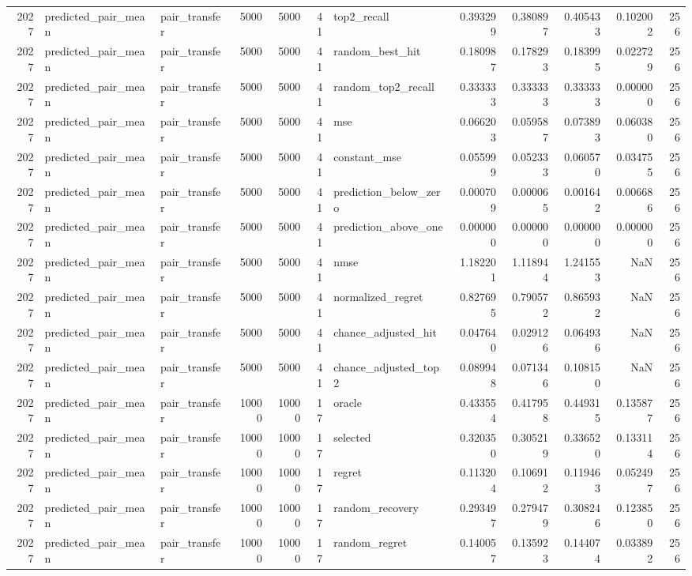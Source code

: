 \begin{tabular}{rllrrrlrrrrr}
2027 & predicted_pair_mean & pair_transfer & 5000 & 5000 & 41 & top2_recall & 0.393299 & 0.380897 & 0.405433 & 0.102002 & 256 \\
2027 & predicted_pair_mean & pair_transfer & 5000 & 5000 & 41 & random_best_hit & 0.180987 & 0.178293 & 0.183995 & 0.022729 & 256 \\
2027 & predicted_pair_mean & pair_transfer & 5000 & 5000 & 41 & random_top2_recall & 0.333333 & 0.333333 & 0.333333 & 0.000000 & 256 \\
2027 & predicted_pair_mean & pair_transfer & 5000 & 5000 & 41 & mse & 0.066203 & 0.059587 & 0.073893 & 0.060380 & 256 \\
2027 & predicted_pair_mean & pair_transfer & 5000 & 5000 & 41 & constant_mse & 0.055999 & 0.052333 & 0.060570 & 0.034755 & 256 \\
2027 & predicted_pair_mean & pair_transfer & 5000 & 5000 & 41 & prediction_below_zero & 0.000709 & 0.000065 & 0.001642 & 0.006686 & 256 \\
2027 & predicted_pair_mean & pair_transfer & 5000 & 5000 & 41 & prediction_above_one & 0.000000 & 0.000000 & 0.000000 & 0.000000 & 256 \\
2027 & predicted_pair_mean & pair_transfer & 5000 & 5000 & 41 & nmse & 1.182201 & 1.118944 & 1.241553 & NaN & 256 \\
2027 & predicted_pair_mean & pair_transfer & 5000 & 5000 & 41 & normalized_regret & 0.827695 & 0.790572 & 0.865932 & NaN & 256 \\
2027 & predicted_pair_mean & pair_transfer & 5000 & 5000 & 41 & chance_adjusted_hit & 0.047640 & 0.029126 & 0.064936 & NaN & 256 \\
2027 & predicted_pair_mean & pair_transfer & 5000 & 5000 & 41 & chance_adjusted_top2 & 0.089948 & 0.071346 & 0.108150 & NaN & 256 \\
2027 & predicted_pair_mean & pair_transfer & 10000 & 10000 & 17 & oracle & 0.433554 & 0.417958 & 0.449315 & 0.135877 & 256 \\
2027 & predicted_pair_mean & pair_transfer & 10000 & 10000 & 17 & selected & 0.320350 & 0.305219 & 0.336520 & 0.133114 & 256 \\
2027 & predicted_pair_mean & pair_transfer & 10000 & 10000 & 17 & regret & 0.113204 & 0.106912 & 0.119463 & 0.052497 & 256 \\
2027 & predicted_pair_mean & pair_transfer & 10000 & 10000 & 17 & random_recovery & 0.293497 & 0.279479 & 0.308246 & 0.123850 & 256 \\
2027 & predicted_pair_mean & pair_transfer & 10000 & 10000 & 17 & random_regret & 0.140057 & 0.135923 & 0.144074 & 0.033892 & 256 \\

\end{tabular}
